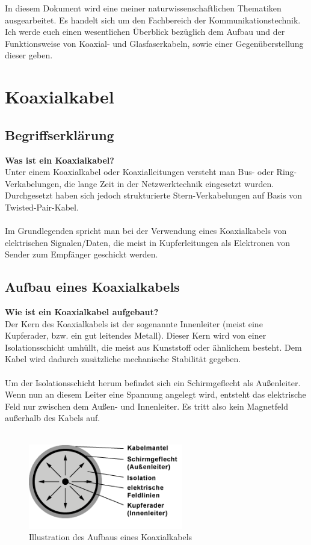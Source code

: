 \documentclass[11pt, a4paper]{article}
\begin{document}
In diesem Dokument wird eine meiner naturwissenschaftlichen Thematiken ausgearbeitet. Es handelt sich um den Fachbereich der Kommunikationstechnik. Ich werde euch einen wesentlichen Überblick bezüglich dem Aufbau und der Funktionsweise von Koaxial- und Glasfaserkabeln, sowie einer Gegenüberstellung dieser geben.

\section{Koaxialkabel \cite{koaxialkabel}} 

\subsection{Begriffserklärung}
\textbf{Was ist ein Koaxialkabel?}\\
Unter einem Koaxialkabel oder Koaxialleitungen versteht man Bus- oder Ring-Verkabelungen, die lange Zeit in der Netzwerktechnik eingesetzt wurden. Durchgesetzt haben sich jedoch strukturierte Stern-Verkabelungen auf Basis von Twisted-Pair-Kabel. \\ \\Im Grundlegenden spricht man bei der Verwendung eines Koaxialkabels von elektrischen Signalen/Daten, die meist in Kupferleitungen als Elektronen von Sender zum Empfänger geschickt werden.

\subsection{Aufbau eines Koaxialkabels}
\textbf{Wie ist ein Koaxialkabel aufgebaut?}\\
Der Kern des Koaxialkabels ist der sogenannte Innenleiter (meist eine Kupferader, bzw. ein gut leitendes Metall). Dieser Kern wird von einer Isolationsschicht umhüllt, die meist aus Kunststoff oder ähnlichem besteht. Dem Kabel wird dadurch zusätzliche mechanische Stabilität gegeben.\\ \\ Um der Isolationsschicht herum befindet sich ein Schirmgeflecht als Außenleiter. Wenn nun an diesem Leiter eine Spannung angelegt wird, entsteht das elektrische Feld nur zwischen dem Außen- und Innenleiter. Es tritt also kein Magnetfeld außerhalb des Kabels auf. \\ \\

\begin{figure}[h!]
	\centering
	\includegraphics[width=0.6\textwidth]{images/coax-aufbau}
	\caption{Illustration des Aufbaus eines Koaxialkabels \cite{koax-img}}
\end{figure}
\end{document}
